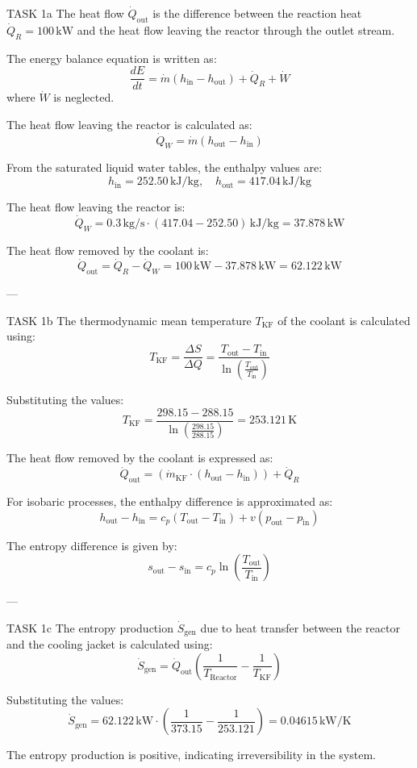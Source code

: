 TASK 1a  
The heat flow \( \dot{Q}_{\text{out}} \) is the difference between the reaction heat \( \dot{Q}_R = 100 \, \text{kW} \) and the heat flow leaving the reactor through the outlet stream.  

The energy balance equation is written as:  
\[
\frac{dE}{dt} = \dot{m} (h_{\text{in}} - h_{\text{out}}) + \dot{Q}_R + \dot{W}
\]  
where \( \dot{W} \) is neglected.  

The heat flow leaving the reactor is calculated as:  
\[
\dot{Q}_W = \dot{m} (h_{\text{out}} - h_{\text{in}})
\]  

From the saturated liquid water tables, the enthalpy values are:  
\[
h_{\text{in}} = 252.50 \, \text{kJ/kg}, \quad h_{\text{out}} = 417.04 \, \text{kJ/kg}
\]  

The heat flow leaving the reactor is:  
\[
\dot{Q}_W = 0.3 \, \text{kg/s} \cdot (417.04 - 252.50) \, \text{kJ/kg} = 37.878 \, \text{kW}
\]  

The heat flow removed by the coolant is:  
\[
\dot{Q}_{\text{out}} = \dot{Q}_R - \dot{Q}_W = 100 \, \text{kW} - 37.878 \, \text{kW} = 62.122 \, \text{kW}
\]  

---

TASK 1b  
The thermodynamic mean temperature \( T_{\text{KF}} \) of the coolant is calculated using:  
\[
T_{\text{KF}} = \frac{\Delta S}{\Delta Q} = \frac{T_{\text{out}} - T_{\text{in}}}{\ln \left( \frac{T_{\text{out}}}{T_{\text{in}}} \right)}
\]  

Substituting the values:  
\[
T_{\text{KF}} = \frac{298.15 - 288.15}{\ln \left( \frac{298.15}{288.15} \right)} = 253.121 \, \text{K}
\]  

The heat flow removed by the coolant is expressed as:  
\[
\dot{Q}_{\text{out}} = (\dot{m}_{\text{KF}} \cdot (h_{\text{out}} - h_{\text{in}})) + \dot{Q}_R
\]  

For isobaric processes, the enthalpy difference is approximated as:  
\[
h_{\text{out}} - h_{\text{in}} = c_p (T_{\text{out}} - T_{\text{in}}) + v (p_{\text{out}} - p_{\text{in}})
\]  

The entropy difference is given by:  
\[
s_{\text{out}} - s_{\text{in}} = c_p \ln \left( \frac{T_{\text{out}}}{T_{\text{in}}} \right)
\]  

---

TASK 1c  
The entropy production \( \dot{S}_{\text{gen}} \) due to heat transfer between the reactor and the cooling jacket is calculated using:  
\[
\dot{S}_{\text{gen}} = \dot{Q}_{\text{out}} \left( \frac{1}{T_{\text{Reactor}}} - \frac{1}{T_{\text{KF}}} \right)
\]  

Substituting the values:  
\[
\dot{S}_{\text{gen}} = 62.122 \, \text{kW} \cdot \left( \frac{1}{373.15} - \frac{1}{253.121} \right) = 0.04615 \, \text{kW/K}
\]  

The entropy production is positive, indicating irreversibility in the system.